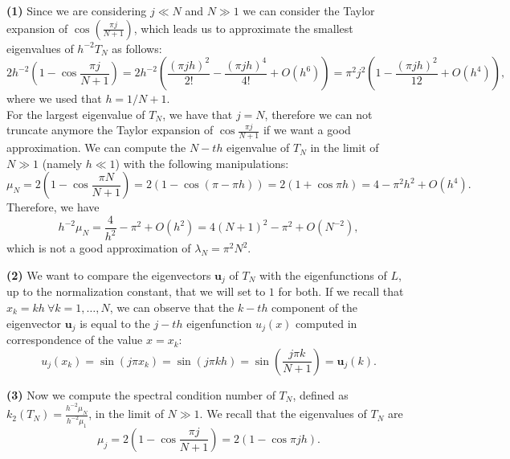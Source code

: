 \documentclass[a4paper,11pt]{article}
\begin{document}
\noindent \textbf{(1)} Since we are considering $j\ll N$ and $N\gg1$ we can consider the Taylor expansion of $\cos \left( \frac{\pi j }{N+1}\right) $,
which leads us to approximate the smallest eigenvalues of $h^{-2} T_N$ as follows:
\begin{equation}\label{Eq:Taylor_exp_small_j}
	2h^{-2} \left( 1- \cos \frac{\pi j }{N+1} \right)  = 2h^{-2} \left(\frac{(\pi j h)^2}{2!} - \frac{(\pi j h)^4}{4!} + O(h^6)\right)  = \pi^2 j^2 \left( 1- \frac{(\pi j h)^2}{12} + O(h^4) \right),
\end{equation}
where we used that $h=1/N+1$.\\
\noindent For the largest eigenvalue of $T_N$, we have that $j = N$, therefore we can not truncate anymore the Taylor expansion of $ \cos \frac{\pi j }{N+1} $ if we want a good approximation. We can compute the $N-th$ eigenvalue of $T_N$ in the limit of $N\gg 1$ (namely $h\ll 1$) with the following manipulations:
\begin{equation}\label{Eq:Taylor_exp_big_j}
	\mu_N = 2\left( 1-\cos  \frac{\pi N}{N+1}\right)   =2(1-\cos (\pi -\pi h) ) = 2(1+\cos\pi h) = 4 - \pi^2 h^2 + O(h^4).
\end{equation}
Therefore, we have
\begin{equation}\label{key}
	h^{-2} \mu_N = \frac{4}{h^2} - \pi^2 + O(h^2) =4(N+1)^2 - \pi^2 + O(N^{-2}),
\end{equation}
which is not a good approximation of $\lambda_N = \pi^2 N^2$.

\noindent \textbf{(2)} We want to compare the eigenvectors $\textbf{u}_j$ of $T_N$ with the eigenfunctions of $L$, up to the normalization constant, that we will set to $1$ for both. If we recall that $x_k = k h\ \forall k = 1,\dots, N$, we can observe that the $k-th$ component of the eigenvector $\textbf{u}_j$ is equal to the $j-th$ eigenfunction $u_j(x)$ computed in correspondence of the value $x=x_k$:
\begin{equation}
	u_j(x_k) = \sin(j \pi x_k) = \sin ( j \pi k h ) = \sin\left( \frac{j \pi k}{N+1}\right)  = \textbf{u}_j(k).
\end{equation}

\noindent \textbf{(3)}  Now we compute the spectral condition number of $T_N$, defined as 	$k_2(T_N) = \frac{h^{-2}\mu_N}{h^{-2}\mu_1}$, in the limit of $N\gg 1$. We recall that the eigenvalues of $T_N$ are
\begin{equation}\label{key}
	\mu_j = 2\left( 1-\cos \frac{\pi j}{N+1}\right) = 2\left( 1-\cos \pi j h\right).
\end{equation}
\end{document}
